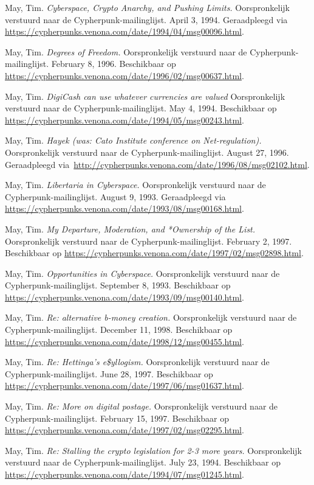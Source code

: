 \documentclass[
  a5paper,
  smalldemyvopaper,11pt,twoside,onecolumn,openright,extrafontsizes,
hidelinks]{memoir}
\begin{document}
May, Tim. \emph{Cyberspace, Crypto Anarchy, and Pushing Limits.}
Oorspronkelijk verstuurd naar de Cypherpunk-mailinglijst. April 3, 1994.
Geraadpleegd via
\url{https://cypherpunks.venona.com/date/1994/04/msg00096.html}.

May, Tim. \emph{Degrees of Freedom.} Oorspronkelijk verstuurd naar de
Cypherpunk-mailinglijst. February 8, 1996. Beschikbaar op
\url{https://cypherpunks.venona.com/date/1996/02/msg00637.html}.

May, Tim. \emph{DigiCash can use whatever currencies are valued}
Oorspronkelijk verstuurd naar de Cypherpunk-mailinglijst. May 4, 1994.
Beschikbaar op
\url{https://cypherpunks.venona.com/date/1994/05/msg00243.html}.

May, Tim. \emph{Hayek (was: Cato Institute conference on
Net-regulation).} Oorspronkelijk verstuurd naar de
Cypherpunk-mailinglijst. August 27, 1996. Geraadpleegd
via~\url{http://cypherpunks.venona.com/date/1996/08/msg02102.html}.

May, Tim. \emph{Libertaria in Cyberspace.} Oorspronkelijk verstuurd naar
de Cypherpunk-mailinglijst. August 9, 1993. Geraadpleegd via
\url{https://cypherpunks.venona.com/date/1993/08/msg00168.html}.

May, Tim. \emph{My Departure, Moderation, and *Ownership of the List.}
Oorspronkelijk verstuurd naar de Cypherpunk-mailinglijst. February 2,
1997. Beschikbaar op
\url{https://cypherpunks.venona.com/date/1997/02/msg02898.html}.

May, Tim. \emph{Opportunities in Cyberspace.} Oorspronkelijk verstuurd
naar de Cypherpunk-mailinglijst. September 8, 1993. Beschikbaar op
\url{https://cypherpunks.venona.com/date/1993/09/msg00140.html}.

May, Tim. \emph{Re: alternative b-money creation.} Oorspronkelijk
verstuurd naar de Cypherpunk-mailinglijst. December 11, 1998.
Beschikbaar op
\url{https://cypherpunks.venona.com/date/1998/12/msg00455.html}.

May, Tim. \emph{Re: Hettinga's e\$yllogism.} Oorspronkelijk verstuurd
naar de Cypherpunk-mailinglijst. June 28, 1997. Beschikbaar op
\url{https://cypherpunks.venona.com/date/1997/06/msg01637.html}.

May, Tim. \emph{Re: More on digital postage.} Oorspronkelijk verstuurd
naar de Cypherpunk-mailinglijst. February 15, 1997. Beschikbaar op
\url{https://cypherpunks.venona.com/date/1997/02/msg02295.html}.

May, Tim. \emph{Re: Stalling the crypto legislation for 2-3 more years.}
Oorspronkelijk verstuurd naar de Cypherpunk-mailinglijst. July 23, 1994.
Beschikbaar op
\url{https://cypherpunks.venona.com/date/1994/07/msg01245.html}.
\end{document}
